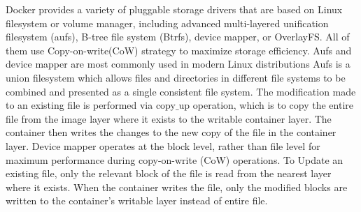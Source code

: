 Docker provides a variety of pluggable storage drivers that are based on Linux
filesystem or volume manager, including advanced multi-layered unification
filesystem (aufs), B-tree file system (Btrfs), device mapper, or OverlayFS.
%
All of them use Copy-on-write(CoW) strategy to maximize storage efficiency.
%
Aufs and device mapper are most commonly used in modern Linux distributions
%
%
Aufs is a union filesystem which allows files and directories in different file
systems to be combined and presented as a single consistent file system. 
The modification made to an existing file is performed via copy$\_$up operation,
which is to copy the entire file from the image layer where it exists to the
writable container layer. The container then writes the changes to the new copy
of the file in the container layer. Device mapper operates at the block level,
rather than file level for maximum performance during copy-on-write (CoW)
operations. To Update an existing file, only the relevant block of the file is
read from the nearest layer where it exists. When the container writes the file,
only the modified blocks are written to the container's writable layer instead of
entire file.
%
%




